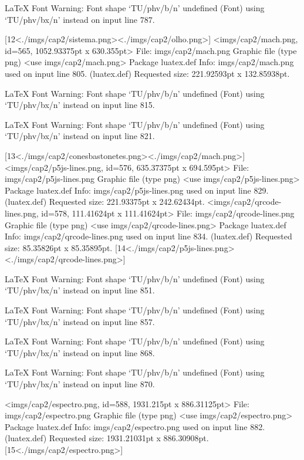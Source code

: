 LaTeX Font Warning: Font shape `TU/phv/b/n' undefined
(Font)              using `TU/phv/bx/n' instead on input line 787.

[12<./imgs/cap2/sistema.png><./imgs/cap2/olho.png>]
<imgs/cap2/mach.png, id=565, 1052.93375pt x 630.355pt>
File: imgs/cap2/mach.png Graphic file (type png)
<use imgs/cap2/mach.png>
Package luatex.def Info: imgs/cap2/mach.png  used on input line 805.
(luatex.def)             Requested size: 221.92593pt x 132.85938pt.

LaTeX Font Warning: Font shape `TU/phv/b/n' undefined
(Font)              using `TU/phv/bx/n' instead on input line 815.


LaTeX Font Warning: Font shape `TU/phv/b/n' undefined
(Font)              using `TU/phv/bx/n' instead on input line 821.

[13<./imgs/cap2/conesbastonetes.png><./imgs/cap2/mach.png>]
<imgs/cap2/p5js-lines.png, id=576, 635.37375pt x 694.595pt>
File: imgs/cap2/p5js-lines.png Graphic file (type png)
<use imgs/cap2/p5js-lines.png>
Package luatex.def Info: imgs/cap2/p5js-lines.png  used on input line 829.
(luatex.def)             Requested size: 221.93375pt x 242.62434pt.
<imgs/cap2/qrcode-lines.png, id=578, 111.41624pt x 111.41624pt>
File: imgs/cap2/qrcode-lines.png Graphic file (type png)
<use imgs/cap2/qrcode-lines.png>
Package luatex.def Info: imgs/cap2/qrcode-lines.png  used on input line 834.
(luatex.def)             Requested size: 85.35826pt x 85.35895pt.
[14<./imgs/cap2/p5js-lines.png><./imgs/cap2/qrcode-lines.png>]

LaTeX Font Warning: Font shape `TU/phv/b/n' undefined
(Font)              using `TU/phv/bx/n' instead on input line 851.


LaTeX Font Warning: Font shape `TU/phv/b/n' undefined
(Font)              using `TU/phv/bx/n' instead on input line 857.


LaTeX Font Warning: Font shape `TU/phv/b/n' undefined
(Font)              using `TU/phv/bx/n' instead on input line 868.


LaTeX Font Warning: Font shape `TU/phv/b/n' undefined
(Font)              using `TU/phv/bx/n' instead on input line 870.

<imgs/cap2/espectro.png, id=588, 1931.215pt x 886.31125pt>
File: imgs/cap2/espectro.png Graphic file (type png)
<use imgs/cap2/espectro.png>
Package luatex.def Info: imgs/cap2/espectro.png  used on input line 882.
(luatex.def)             Requested size: 1931.21031pt x 886.30908pt.
[15<./imgs/cap2/espectro.png>]


